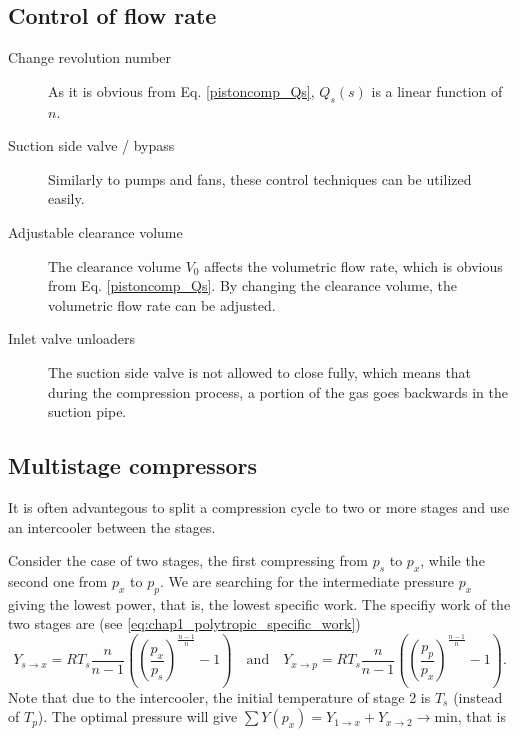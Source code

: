 \subsection{Control of flow rate}
\begin{description}
\item[Change revolution number] As it is obvious from Eq. \ref{pistoncomp_Qs}, $Q_s(s)$ is a linear function of $n$.

\item[Suction side valve / bypass] Similarly to pumps and fans, these control techniques can be utilized easily. 

\item[Adjustable clearance volume] The clearance volume $V_0$ affects the volumetric flow rate, which is obvious from Eq. \ref{pistoncomp_Qs}. By changing the clearance volume, the volumetric flow rate can be adjusted.

\item[Inlet valve unloaders] The suction side valve is not allowed to close fully, which means that during the compression process, a portion of the gas goes backwards in the suction pipe. 
\end{description}

\subsection{Multistage compressors}

It is often advantegous to split a compression cycle to two or more stages and use an intercooler between the stages.


Consider the case of two stages, the first compressing from $p_s$ to $p_x$, while the second one from $p_x$ to $p_p$. We are searching for the intermediate pressure $p_x$ giving the lowest power, that is, the lowest specific work. The specifiy work of the two stages are (see \eqref{eq:chap1_polytropic_specific_work})
%
\begin{equation}
Y_{s\rightarrow x}=R T_s \frac{n}{n-1}\left( \left( \frac{p_x}{p_s}\right)^{\frac{n-1}{n}}-1 \right) 
\quad \text{and} \quad
Y_{x\rightarrow p}=R T_s \frac{n}{n-1}\left( \left( \frac{p_p}{p_x}\right)^{\frac{n-1}{n}}-1 \right).
\end{equation}
%
Note that due to the intercooler, the initial temperature of stage 2 is $T_s$ (instead of $T_p$). The optimal pressure will give $\sum Y(p_x)=Y_{1\rightarrow x}+Y_{x\rightarrow 2} \rightarrow \text{min}$, that is

